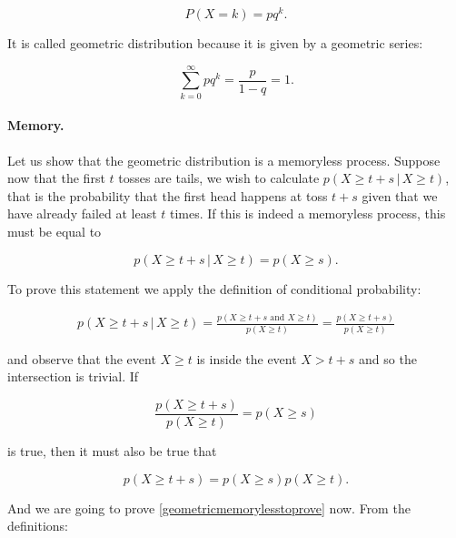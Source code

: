 \documentclass[12pt]{article}
\begin{document}
\begin{equation} \label{geometricdistribution}
P(X = k) = p q^{k}.
\end{equation}

\noindent
It is called geometric distribution because it is given by a geometric series:

\begin{equation}
\sum_{k=0}^{\infty} p q^{k} = \frac{p}{1 - q} = 1.
\end{equation}

\paragraph{Memory.}
Let us show that the geometric distribution is a memoryless process.
Suppose now that the first $t$ tosses are tails, we wish 
to calculate 
$ p ( X \geq t + s \, | \, X \geq t ) $, that is
the probability that the first head happens at toss $t + s$ given 
that we have already failed at least $t$ times.
If this is indeed a memoryless process, this must be equal to

\begin{equation} \label{memorylessProcess}
p ( X \geq t + s \, | \, X \geq t ) = 
p ( X \geq s ).
\end{equation}

To prove this statement we apply the definition of conditional probability:

\begin{align}
p ( X \geq t + s \, | \, X \geq t ) = 
\frac{p ( X \geq t + s \, \, \text{and} \, \, X \geq t )}{ p( X \geq t) } =
\frac{p ( X \geq t + s )}{ p( X \geq t) } 
\end{align}

\noindent
and observe that the event $X \geq t$ is inside the event $X > t + s$ and so 
the intersection is trivial.
If 

\begin{equation}
\frac{p ( X \geq t + s )}{ p( X \geq t) }  = 
p ( X \geq s )
\end{equation}

\noindent
is true, then it must also be true that

\begin{equation} \label{geometricmemorylesstoprove}
p( X \geq t + s ) =
p( X \geq s ) p ( X \geq t).
\end{equation}

\noindent
And we are going to prove \eqref{geometricmemorylesstoprove} now.
From the definitions:
\end{document}

